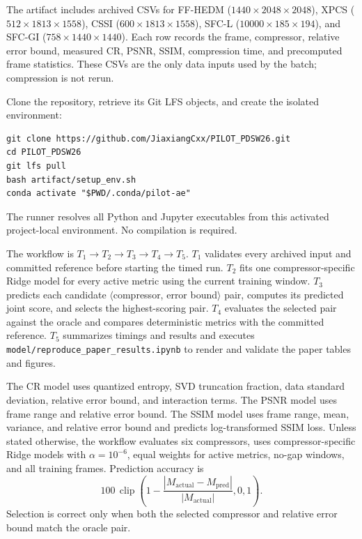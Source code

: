 The artifact includes archived CSVs for FF-HEDM
($1440\times2048\times2048$), XPCS ($512\times1813\times1558$), CSSI
($600\times1813\times1558$), SFC-L ($10000\times185\times194$), and SFC-GI
($758\times1440\times1440$). Each row records the frame, compressor, relative
error bound, measured CR, PSNR, SSIM, compression time, and precomputed frame
statistics. These CSVs are the only data inputs used by the batch; compression
is not rerun.

Clone the repository, retrieve its Git LFS objects, and create the isolated
environment:
\begin{verbatim}
git clone https://github.com/JiaxiangCxx/PILOT_PDSW26.git
cd PILOT_PDSW26
git lfs pull
bash artifact/setup_env.sh
conda activate "$PWD/.conda/pilot-ae"
\end{verbatim}
The runner resolves all Python and Jupyter executables from this activated
project-local environment. No compilation is required.

\artcomp
The workflow is
$T_1\rightarrow T_2\rightarrow T_3\rightarrow T_4\rightarrow T_5$.
$T_1$ validates every archived input and committed reference before starting
the timed run. $T_2$ fits one compressor-specific Ridge model for every active
metric using the current training window. $T_3$ predicts each candidate
$\langle$compressor, error bound$\rangle$ pair, computes its predicted joint
score, and selects the highest-scoring pair. $T_4$ evaluates the selected pair
against the oracle and compares deterministic metrics with the committed
reference. $T_5$ summarizes timings and results and executes
\texttt{model/reproduce\_paper\_results.ipynb} to render and validate the
paper tables and figures.

The CR model uses quantized entropy, SVD truncation fraction, data standard
deviation, relative error bound, and interaction terms. The PSNR model uses
frame range and relative error bound. The SSIM model uses frame range, mean,
variance, and relative error bound and predicts log-transformed SSIM loss.
Unless stated otherwise, the workflow evaluates six compressors, uses
compressor-specific Ridge models with $\alpha=10^{-6}$, equal weights for
active metrics, no-gap windows, and all training frames. Prediction accuracy is
\[
100\,\operatorname{clip}\!\left(
1-\frac{|M_{\mathrm{actual}}-M_{\mathrm{pred}}|}
{|M_{\mathrm{actual}}|},0,1\right).
\]
Selection is correct only when both the selected compressor and relative error
bound match the oracle pair.

